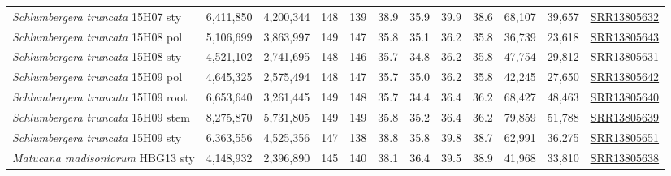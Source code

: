 \documentclass[fleqn,10pt,lineno]{wlpeerj}
\begin{document}
\begin{table}[ht]
{\begin{tabular}{l|cc|cc|cc|cc|cc|c}
\textit{Schlumbergera truncata} 15H07 sty   & 6,411,850 & 4,200,344 & 148 & 139 & 38.9 & 35.9 & 39.9 & 38.6 & 68,107 & 39,657 & \href{https://trace.ncbi.nlm.nih.gov/Traces/sra/?run=SRR13805632}{SRR13805632} \\
\textit{Schlumbergera truncata} 15H08 pol   & 5,106,699 & 3,863,997 & 149 & 147 & 35.8 & 35.1 & 36.2 & 35.8 & 36,739 & 23,618 & \href{https://trace.ncbi.nlm.nih.gov/Traces/sra/?run=SRR13805643}{SRR13805643} \\
\textit{Schlumbergera truncata} 15H08 sty   & 4,521,102 & 2,741,695 & 148 & 146 & 35.7 & 34.8 & 36.2 & 35.8 & 47,754 & 29,812 & \href{https://trace.ncbi.nlm.nih.gov/Traces/sra/?run=SRR13805631}{SRR13805631} \\
\textit{Schlumbergera truncata} 15H09 pol   & 4,645,325 & 2,575,494 & 148 & 147 & 35.7 & 35.0 & 36.2 & 35.8 & 42,245 & 27,650 & \href{https://trace.ncbi.nlm.nih.gov/Traces/sra/?run=SRR13805642}{SRR13805642} \\
\textit{Schlumbergera truncata} 15H09 root  & 6,653,640 & 3,261,445 & 149 & 148 & 35.7 & 34.4 & 36.4 & 36.2 & 68,427 & 48,463 & \href{https://trace.ncbi.nlm.nih.gov/Traces/sra/?run=SRR13805640}{SRR13805640} \\
\textit{Schlumbergera truncata} 15H09 stem  & 8,275,870 & 5,731,805 & 149 & 149 & 35.8 & 35.2 & 36.4 & 36.2 & 79,859 & 51,788 & \href{https://trace.ncbi.nlm.nih.gov/Traces/sra/?run=SRR13805639}{SRR13805639} \\
\textit{Schlumbergera truncata} 15H09 sty   & 6,363,556 & 4,525,356 & 147 & 138 & 38.8 & 35.8 & 39.8 & 38.7 & 62,991 & 36,275 & \href{https://trace.ncbi.nlm.nih.gov/Traces/sra/?run=SRR13805651}{SRR13805651} \\
\textit{Matucana madisoniorum} HBG13 sty    & 4,148,932 & 2,396,890 & 145 & 140 & 38.1 & 36.4 & 39.5 & 38.9 & 41,968 & 33,810 & \href{https://trace.ncbi.nlm.nih.gov/Traces/sra/?run=SRR13805638}{SRR13805638} \\
\bottomrule
\end{tabular}}
\end{table}

\textbf{}



\clearpage
\end{document}
